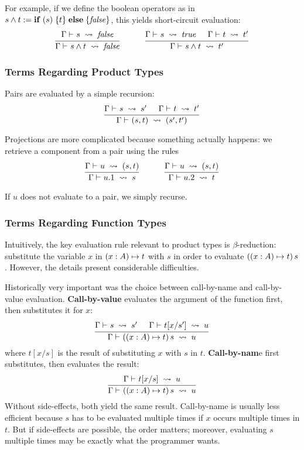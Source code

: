 For example, if we define the boolean operators as in $s\wedge t:=\aifelseI{s}{t}{\false}$, this yields short-circuit evaluation:
\[\rul{\evobj{}{\Gamma}{s}{\false}}
      {\evobj{}{\Gamma}{s\wedge t}{\false}}
\tb\tb
\rul{\evobj{}{\Gamma}{s}{\true} \tb\evobj{}{\Gamma}{t}{t'}}
      {\evobj{}{\Gamma}{s\wedge t}{t'}}
\]


\subsubsection{Terms Regarding Product Types}

Pairs are evaluated by a simple recursion:
\[\cfrac{\Gamma\vdash^{}_{}s\;\rightsquigarrow\;s' \hspace*{.5cm} \Gamma\vdash^{}_{}t\;\rightsquigarrow\;t'}{\Gamma\vdash^{}_{}(s,t)\;\rightsquigarrow\;(s',t')}\,
\]

Projections are more complicated because something actually happens: we retrieve a component from a pair using the rules
\[\rul{\evobj{}{\Gamma}{u}{(s,t)}}
      {\evobj{}{\Gamma}{u.1}{s}}
\tb\tb
\rul{\evobj{}{\Gamma}{u}{(s,t)}}
      {\evobj{}{\Gamma}{u.2}{t}}
\]

If $u$ does not evaluate to a pair, we simply recurse.

\subsubsection{Terms Regarding Function Types}

Intuitively, the key evaluation rule relevant to product types is $\beta$-reduction: substitute the variable $x$ in $\alam[A]{x}{t}$ with $s$ in order to evaluate $(\alam[A]{x}{t})\,s$.
However, the details  present considerable difficulties.

Historically very important was the choice between call-by-name and call-by-value evaluation.
\textbf{Call-by-value} evaluates the argument of the function first, then substitutes it for $x$:
\[\rul{\evobj{}{\Gamma}{s}{s'} \tb\evobj{}{\Gamma}{t[x/s']}{u}}
      {\evobj{}{\Gamma}{(\alam[A]{x}{t})\,s}{u}}
\]
where $t[x/s]$ is the result of substituting $x$ with $s$ in $t$.
\textbf{Call-by-nam}e first substitutes, then evaluates the result:
\[\rul{\evobj{}{\Gamma}{t[x/s]}{u}}
      {\evobj{}{\Gamma}{(\alam[A]{x}{t})\,s}{u}}
\]
Without side-effects, both yield the same result.
Call-by-name is usually less efficient because $s$ has to be evaluated multiple times if $x$ occurs multiple times in $t$.
But if side-effects are possible, the order matters; moreover, evaluating $s$ multiple times may be exactly what the programmer wants.
\medskip

